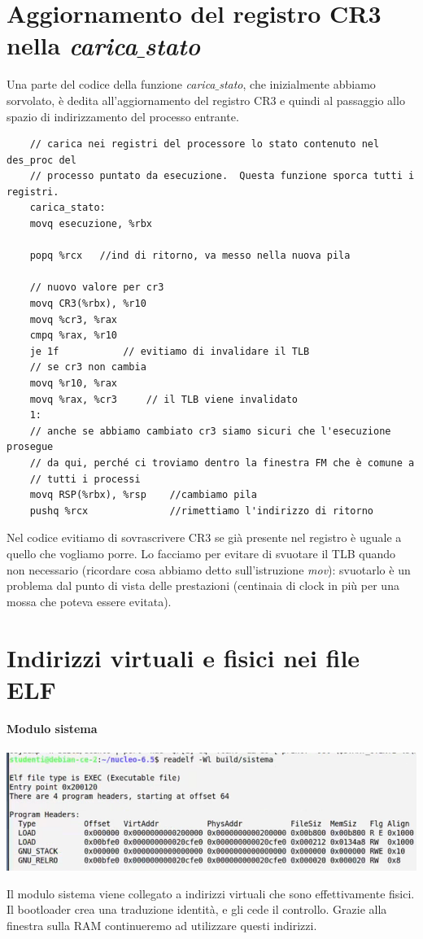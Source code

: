 \section{Aggiornamento del registro CR3 nella \emph{carica$\_$stato}} Una parte del codice della funzione \emph{carica$\_$stato}, che inizialmente abbiamo sorvolato, è dedita all'aggiornamento del registro CR3 e quindi al passaggio allo spazio di indirizzamento del processo entrante.
\small
\begin{verbatim}
	// carica nei registri del processore lo stato contenuto nel des_proc del
	// processo puntato da esecuzione.  Questa funzione sporca tutti i registri.
	carica_stato:
	movq esecuzione, %rbx
	
	popq %rcx   //ind di ritorno, va messo nella nuova pila
	
	// nuovo valore per cr3
	movq CR3(%rbx), %r10
	movq %cr3, %rax
	cmpq %rax, %r10
	je 1f			// evitiamo di invalidare il TLB
	// se cr3 non cambia
	movq %r10, %rax
	movq %rax, %cr3		// il TLB viene invalidato
	1:
	// anche se abbiamo cambiato cr3 siamo sicuri che l'esecuzione prosegue
	// da qui, perché ci troviamo dentro la finestra FM che è comune a
	// tutti i processi
	movq RSP(%rbx), %rsp    //cambiamo pila
	pushq %rcx              //rimettiamo l'indirizzo di ritorno
\end{verbatim}
\normalsize 
Nel codice evitiamo di sovrascrivere CR3 se già presente nel registro è uguale a quello che vogliamo porre. Lo facciamo per evitare di svuotare il TLB quando non necessario (ricordare cosa abbiamo detto sull'istruzione \emph{mov}): svuotarlo è un problema dal punto di vista delle prestazioni (centinaia di clock in più per una mossa che poteva essere evitata).


\section{Indirizzi virtuali e fisici nei file ELF}
\paragraph{Modulo sistema}
\begin{center}
	\includegraphics[scale=.75]{img/252.PNG}
\end{center}
Il modulo sistema viene collegato a indirizzi virtuali che sono effettivamente fisici. Il bootloader crea una traduzione identità, e gli cede il controllo. Grazie alla finestra sulla RAM continueremo ad utilizzare questi indirizzi. 


